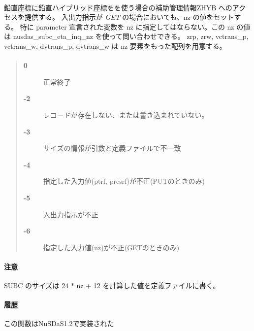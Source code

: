 \paragraph{\FuncDesc}鉛直座標に鉛直ハイブリッド座標をを使う場合の補助管理情報ZHYB
へのアクセスを提供する。
入出力指示が {\it GET} の場合においても、nz の値をセットする。
特に parameter 宣言された変数を nz に指定してはならない。この nz の値は
nusdas\_subc\_eta\_inq\_nz を使って問い合わせできる。
zrp, zrw, vctrans\_p, vctrans\_w, dvtrans\_p, dvtrans\_w は 
nz 要素をもった配列を用意する。
\paragraph{\ResultCode}
\begin{quote}
\begin{description}
\item[{\bf 0}] 正常終了
\item[{\bf -2}] レコードが存在しない、または書き込まれていない。
\item[{\bf -3}] サイズの情報が引数と定義ファイルで不一致
\item[{\bf -4}] 指定した入力値(ptrf, presrf)が不正(PUTのときのみ)
\item[{\bf -5}] 入出力指示が不正
\item[{\bf -6}] 指定した入力値(nz)が不正(GETのときのみ)
\end{description}\end{quote}
\paragraph{ 注意 }
SUBC のサイズは 24 $\ast$ nz + 12 を計算した値を定義ファイルに書く。
\paragraph{ 履歴 }
この関数はNuSDaS1.2で実装された
